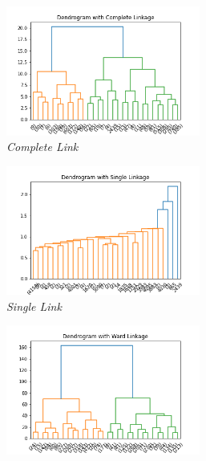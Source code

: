 \begin{figure}[h!]
    \centering
	\vspace*{-0.3cm}
    \begin{subfigure}{0.49\textwidth}
        \centering
        \includegraphics[width=0.7\textwidth]{img/clustering/complete_link.png}
        \caption{\emph{Complete Link}}
        \label{fig:clink_img}
    \end{subfigure}
    \begin{subfigure}{0.49\textwidth}
        \centering
        \includegraphics[width=0.7\textwidth]{img/clustering/single_link.png}
        \caption{\emph{Single Link}}
        \label{fig:slink_img}
    \end{subfigure}
    \begin{subfigure}{0.49\textwidth}
        \centering
        \includegraphics[width=0.7\textwidth]{img/clustering/ward_link.png}

\end{subfigure}
\end{figure}
